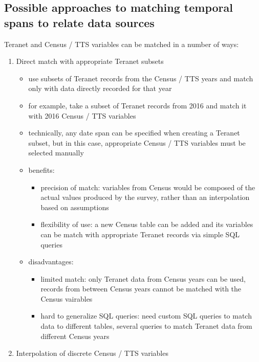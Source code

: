 \subsection{Possible approaches to matching temporal spans to relate data sources} \label{subsec:possible_approaches_to_match_temporal_spans}

Teranet and Census / TTS variables can be matched in a number of ways:

\begin{enumerate}
    \item Direct match with appropriate Teranet subsets
    \begin{itemize}
        \item use subsets of Teranet records from the Census / TTS years and match only with data directly recorded for that year
        \item for example, take a subset of Teranet records from 2016 and match it with 2016 Census / TTS variables
        \item technically, any date span can be specified when creating a Teranet subset, but in this case, appropriate Census / TTS variables must be selected manually
        \item benefits:
        \begin{itemize}
            \item precision of match: variables from Census would be composed of the actual values produced by the survey, rather than an interpolation based on assumptions
            \item flexibility of use: a new Census table can be added and its variables can be match with appropriate Teranet records via simple SQL queries
        \end{itemize}
        \item disadvantages:
        \begin{itemize}
            \item limited match: only Teranet data from Census years can be used, records from between Census years cannot be matched with the Census vairables
            \item hard to generalize SQL queries: need custom SQL queries to match data to different tables, several queries to match Teranet data from different Census years
        \end{itemize}
    \end{itemize}
    \item Interpolation of discrete Census / TTS variables
    \begin{itemize}

\end{itemize}
\end{enumerate}
